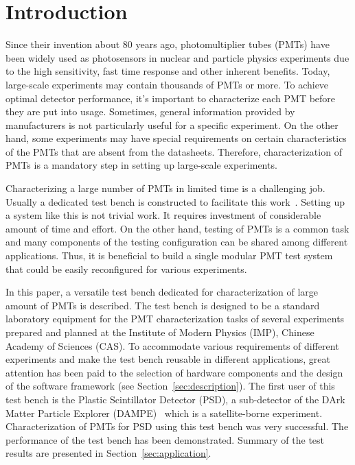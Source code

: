 \documentclass{nst}
\begin{document}

\maketitle


\section{Introduction}
\label{sec:introduction}

Since their invention about 80 years ago, photomultiplier tubes (PMTs) have been widely used as photosensors in nuclear and particle physics experiments due to the high sensitivity, fast time response and other inherent benefits. 
Today, large-scale experiments may contain thousands of PMTs or more. To achieve optimal detector performance, it's important to characterize each PMT before they are put into usage. 
Sometimes, general information provided by manufacturers is not particularly useful for a specific experiment.
On the other hand, some experiments may have special requirements on certain characteristics of the PMTs that are absent from the datasheets. 
Therefore, characterization of PMTs is a mandatory step in setting up large-scale experiments.

Characterizing a large number of PMTs in limited time is a challenging job. Usually a dedicated test bench is constructed to facilitate this work~\cite{barnhill_testing_2008,akgun_complete_2005,adragna_pmt-block_2006}.
Setting up a system like this is not trivial work. It requires investment of considerable amount of time and effort.
On the other hand, testing of PMTs is a common task and many components of the testing configuration can be shared among different applications.
Thus, it is beneficial to build a single modular PMT test system that could be easily reconfigured for various experiments.

In this paper, a versatile test bench dedicated for characterization of large amount of PMTs is described.
The test bench is designed to be a standard laboratory equipment for the PMT characterization tasks of several experiments prepared and planned at the Institute of Modern Physics (IMP), Chinese Academy of Sciences (CAS).
To accommodate various requirements of different experiments and make the test bench reusable in different applications, great attention has been paid to the selection of  hardware components and the design of the software framework (see Section~\ref{sec:description}).
The first user of this test bench is the Plastic Scintillator Detector (PSD), a sub-detector of the DArk Matter Particle Explorer (DAMPE)~\cite{Chang_Jin_dampe} which is a satellite-borne experiment. 
Characterization of PMTs for PSD using this test bench was very successful. The performance of the test bench has been demonstrated.
Summary of the test results are presented in Section~\ref{sec:application}.
\end{document}
